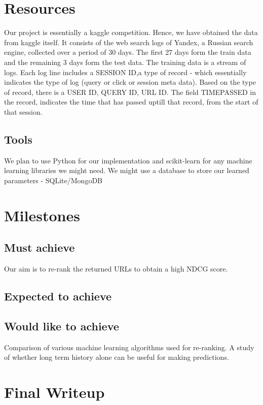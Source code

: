 \documentclass[11pt]{article}
\begin{document}
\section{Resources}
Our project is essentially a kaggle competition. Hence, we have obtained the data from kaggle itself. It consists of the web search logs of Yandex, a Russian search engine, collected over a period of 30 days. The first 27 days form the train data and the remaining 3 days form the test data. \newline
The training data is a stream of logs. Each log line includes a SESSION ID,a type of record  - which essentially indicates the type of log (query or click or session meta data). Based on the type of record, there is a USER ID, QUERY ID, URL ID. The field TIMEPASSED in the record, indicates the time that has passed uptill that record, from the start of that session. 

\subsection{Tools}
We plan to use Python for our implementation and scikit-learn for any machine learning libraries we might need. \newline
We might use a database to store our learned parameters - SQLite/MongoDB
\section{Milestones}
\subsection{Must achieve}
Our aim is to re-rank the returned URLs to obtain a high NDCG score.  
\subsection{Expected to achieve}

\subsection{Would like to achieve}
Comparison of various machine learning algorithms used for re-ranking. A study of whether long term history alone can be useful for making predictions. 

\section{Final Writeup}
\end{document}
